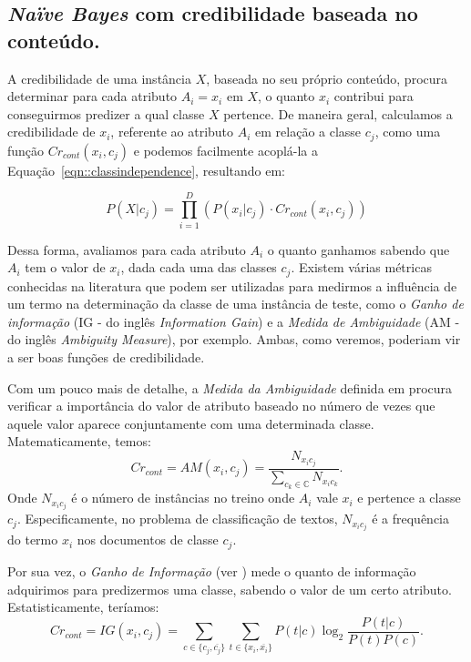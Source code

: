 \subsection{\textit{Naïve Bayes} com credibilidade baseada no conteúdo.}
\label{subsubsec::nbcredconteudo}

A credibilidade de uma instância $X$, baseada no seu próprio conteúdo, procura determinar para cada atributo $A_i = x_i$ em $X$, o quanto $x_i$ contribui para conseguirmos predizer a qual classe $X$ pertence. De maneira geral, calculamos a credibilidade de $x_i$, referente ao atributo $A_i$ em relação a classe $c_j$, como uma função $Cr_{cont}(x_i, c_j)$ e podemos facilmente acoplá-la a Equação~\ref{eqn::classindependence}, resultando em:

\begin{equation}\label{eqn::classindependence_conteudo}
   P(X|c_{j}) = \prod^{D}_{i=1}{(P(x_i|c_j) \cdot Cr_{cont}(x_i,c_j))} 
\end{equation}

Dessa forma, avaliamos para cada atributo $A_i$ o quanto ganhamos sabendo que $A_i$ tem o valor de $x_i$, dada cada uma das classes $c_j$. Existem várias métricas conhecidas na literatura que podem ser utilizadas para medirmos a influência de um termo na determinação da classe de uma instância de teste, como o \textit{Ganho de informação} (IG - do inglês \textit{Information Gain}) e a \textit{Medida de Ambiguidade} (AM - do inglês \textit{Ambiguity Measure}), por exemplo. Ambas, como veremos, poderiam vir a ser boas funções de credibilidade. 


    Com um pouco mais de detalhe, a \textit{Medida da Ambiguidade} definida em \cite{Mengle08} procura verificar a importância do valor de atributo baseado no número de vezes que aquele valor aparece conjuntamente com uma determinada classe. Matematicamente, temos:
\begin{equation}\label{eqn::classindependence_conteudo_am}
   Cr_{cont} = AM(x_i, c_j) = \frac{ N_{x_{i}c_{j}}}{\sum_{c_k \in \mathbb{C}} N_{x_{i}c_{k}}}.
\end{equation}
   Onde $N_{x_{i}c_{j}}$ é o número de instâncias no treino onde $A_i$ vale $x_i$ e pertence a classe $c_j$. Especificamente, no problema de classificação de textos, $N_{x_{i}c_{j}}$ é a frequência do termo $x_i$ nos documentos de classe $c_j$.

    Por sua vez, o \textit{Ganho de Informação} (ver \cite{forman03}) mede o quanto de informação adquirimos para predizermos uma classe, sabendo o valor de um certo atributo. Estatisticamente, teríamos:
\begin{equation}\label{eqn::classindependence_conteudo_ig}
   Cr_{cont} = IG(x_i, c_j) = \sum_{c \in \{c_j, \overline{c_j}\}}\sum_{t \in \{x_i, \overline{x_i}\}}P(t|c)\log_2\frac{P(t|c)}{P(t)P(c)}.
\end{equation}

